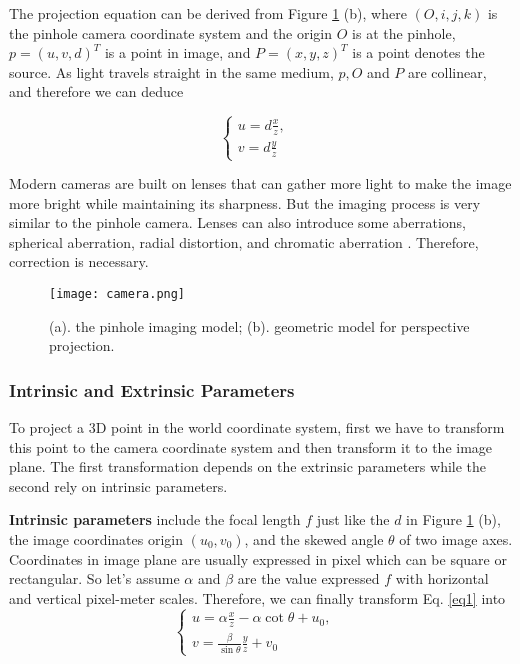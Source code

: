 The projection equation can be derived from Figure \ref{figure:camera} (b), where $ (O, i, j, k) $ is the pinhole camera coordinate system and the origin $O$ is at the pinhole,  $p=(u, v, d)^T$ is a point in image, and   $P=(x, y, z)^T$ is a point denotes the source. As light travels straight in the same medium, $p, O$ and $P$ are collinear, and therefore we can deduce  

\begin{equation}
\label{eq1}
	\begin{cases}
	u = d\frac{x}{z}, & \\    
	v = d\frac{y}{z}   
	\end{cases}
\end{equation}

Modern cameras are built on lenses that can gather more light to make the image more bright while maintaining its sharpness. But the imaging process is very similar to the pinhole camera. Lenses can also introduce some aberrations, \eg spherical aberration, radial distortion, and chromatic aberration \cite{Forsyth:2002:CVM:580035}. Therefore, correction is necessary.

\begin{figure}[h]		
	\texttt{[image: camera.png]}
	\caption{(a). the pinhole imaging model; (b). geometric model for perspective projection. \cite{Forsyth:2002:CVM:580035}}
	\centering
	\label{figure:camera}
\end{figure}

\subsubsection{Intrinsic and Extrinsic Parameters}

To project a 3D point in the world coordinate system, first we have to transform this point to the camera coordinate system and then transform it to the image plane. The first transformation depends on the extrinsic parameters while the second rely on intrinsic parameters.

\textbf{Intrinsic parameters} include the focal length $f$ just like the $d$ in Figure \ref{figure:camera} (b), the image coordinates origin $(u_0, v_0)$, and the skewed angle $\theta$ of two image axes. Coordinates in image plane are usually expressed in pixel which can be square or rectangular. So let's assume $\alpha$ and $\beta$ are the value expressed $f$ with horizontal and vertical pixel-meter scales. Therefore, we can finally transform Eq. \ref{eq1} into 
\begin{equation}
\label{eq2}
	\begin{cases}
	u = \alpha \frac{x}{z} - \alpha \cot\theta + u_0, & \\    
	v = \frac{\beta}{\sin\theta} \frac{y}{z} + v_0
	\end{cases}
\end{equation}


